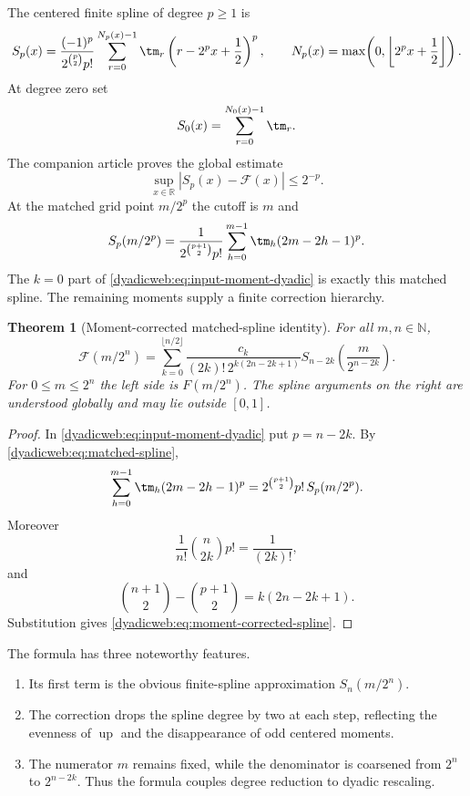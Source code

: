 \documentclass[11pt,oneside]{article}
\newtheorem{theorem}{Theorem}[section]
\theoremstyle{definition}
\theoremstyle{remark}
\newcommand{\R}{\mathbb R}
\newcommand{\N}{\mathbb N}
\newcommand{\Up}{\operatorname{up}}
\begin{document}
The centered finite spline of degree $p\ge1$ is
\begin{equation}
 S_p(x)=\frac{(-1)^p}{2^{\binom p2}p!}
 \sum_{r=0}^{N_p(x)-1}\tm_r\left(r-2^px+\frac12\right)^p,
 \qquad
 N_p(x)=\max\!\left(0,\left\lfloor2^px+\frac12\right\rfloor\right). \label{dyadicweb:eq:centered-spline-local}
\end{equation}
At degree zero set
\begin{equation}
 S_0(x)=\sum_{r=0}^{N_0(x)-1}\tm_r.                        \label{dyadicweb:eq:S0-local}
\end{equation}
The companion article proves the global estimate
\begin{equation}
 \sup_{x\in\R}|S_p(x)-\mathcal F(x)|\le2^{-p}.             \label{dyadicweb:eq:centered-global-error-input}
\end{equation}
At the matched grid point $m/2^p$ the cutoff is $m$ and
\begin{equation}
 S_p(m/2^p)=\frac{1}{2^{\binom{p+1}{2}}p!}
 \sum_{h=0}^{m-1}\tm_h(2m-2h-1)^p.                       \label{dyadicweb:eq:matched-spline}
\end{equation}
The $k=0$ part of \eqref{dyadicweb:eq:input-moment-dyadic} is exactly this matched spline.  The remaining
moments supply a finite correction hierarchy.

\begin{theorem}[Moment-corrected matched-spline identity]
\label{dyadicweb:thm:moment-corrected-spline}
For all $m,n\in\N$,
\begin{equation}
 \boxed{
 \mathcal F(m/2^n)=
 \sum_{k=0}^{\lfloor n/2\rfloor}
 \frac{c_k}{(2k)!\,2^{k(2n-2k+1)}}
 S_{n-2k}\!\left(\frac{m}{2^{n-2k}}\right).}              \label{dyadicweb:eq:moment-corrected-spline}
\end{equation}
For $0\le m\le2^n$ the left side is $F(m/2^n)$.  The spline arguments on the right are
understood globally and may lie outside $[0,1]$.
\end{theorem}

\begin{proof}
In \eqref{dyadicweb:eq:input-moment-dyadic} put $p=n-2k$.  By
\eqref{dyadicweb:eq:matched-spline},
\[
 \sum_{h=0}^{m-1}\tm_h(2m-2h-1)^p
 =2^{\binom{p+1}{2}}p!\,S_p(m/2^p).
\]
Moreover
\[
 \frac1{n!}\binom n{2k}p!=\frac1{(2k)!},
\]
and
\[
 \binom{n+1}{2}-\binom{p+1}{2}=k(2n-2k+1).
\]
Substitution gives \eqref{dyadicweb:eq:moment-corrected-spline}.
\end{proof}

The formula has three noteworthy features.
\begin{enumerate}
\item Its first term is the obvious finite-spline approximation $S_n(m/2^n)$.
\item The correction drops the spline degree by two at each step, reflecting the evenness of
      $\Up$ and the disappearance of odd centered moments.
\item The numerator $m$ remains fixed, while the denominator is coarsened from $2^n$ to
      $2^{n-2k}$.  Thus the formula couples degree reduction to dyadic rescaling.
\end{enumerate}
\end{document}
